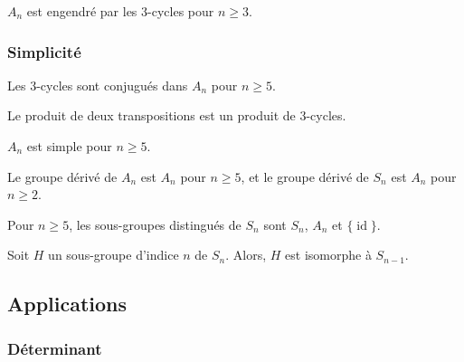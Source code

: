   \begin{proposition}
    $A_n$ est engendré par les $3$-cycles pour $n \geq 3$.
  \end{proposition}

  \subsubsection{Simplicité}


  \begin{lemma}
    Les $3$-cycles sont conjugués dans $A_n$ pour $n \geq 5$.
  \end{lemma}


  \begin{lemma}
    Le produit de deux transpositions est un produit de $3$-cycles.
  \end{lemma}


  \begin{theorem}
    $A_n$ est simple pour $n \geq 5$.
  \end{theorem}

  \begin{corollary}
    Le groupe dérivé de $A_n$ est $A_n$ pour $n \geq 5$, et le groupe dérivé de $S_n$ est $A_n$ pour $n \geq 2$.
  \end{corollary}

  \begin{corollary}
    Pour $n \geq 5$, les sous-groupes distingués de $S_n$ sont $S_n$, $A_n$ et $\{ \operatorname{id} \}$.
  \end{corollary}

  \begin{corollary}
    Soit $H$ un sous-groupe d'indice $n$ de $S_n$. Alors, $H$ est isomorphe à $S_{n-1}$.
  \end{corollary}

  \subsection{Applications}

  \subsubsection{Déterminant}


